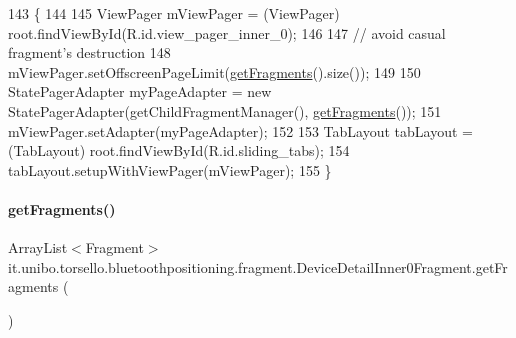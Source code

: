 \begin{DoxyCode}
143                                              \{
144 
145         ViewPager mViewPager = (ViewPager) root.findViewById(R.id.view\_pager\_inner\_0);
146 
147         \textcolor{comment}{// avoid casual fragment's destruction}
148         mViewPager.setOffscreenPageLimit(\hyperlink{classit_1_1unibo_1_1torsello_1_1bluetoothpositioning_1_1fragment_1_1DeviceDetailInner0Fragment_a8cec7494e43938243befe1397abdda05_a8cec7494e43938243befe1397abdda05}{getFragments}().size());
149 
150         StatePagerAdapter myPageAdapter = \textcolor{keyword}{new} StatePagerAdapter(getChildFragmentManager(), 
      \hyperlink{classit_1_1unibo_1_1torsello_1_1bluetoothpositioning_1_1fragment_1_1DeviceDetailInner0Fragment_a8cec7494e43938243befe1397abdda05_a8cec7494e43938243befe1397abdda05}{getFragments}());
151         mViewPager.setAdapter(myPageAdapter);
152 
153         TabLayout tabLayout = (TabLayout) root.findViewById(R.id.sliding\_tabs);
154         tabLayout.setupWithViewPager(mViewPager);
155     \}
\end{DoxyCode}
\hypertarget{classit_1_1unibo_1_1torsello_1_1bluetoothpositioning_1_1fragment_1_1DeviceDetailInner0Fragment_a8cec7494e43938243befe1397abdda05_a8cec7494e43938243befe1397abdda05}{}\label{classit_1_1unibo_1_1torsello_1_1bluetoothpositioning_1_1fragment_1_1DeviceDetailInner0Fragment_a8cec7494e43938243befe1397abdda05_a8cec7494e43938243befe1397abdda05} 
\paragraph{\texorpdfstring{get\+Fragments()}{getFragments()}}
{\footnotesize\ttfamily Array\+List$<$Fragment$>$ it.\+unibo.\+torsello.\+bluetoothpositioning.\+fragment.\+Device\+Detail\+Inner0\+Fragment.\+get\+Fragments (\begin{DoxyParamCaption}{ }\end{DoxyParamCaption})\hspace{0.3cm}{\ttfamily [private]}}


